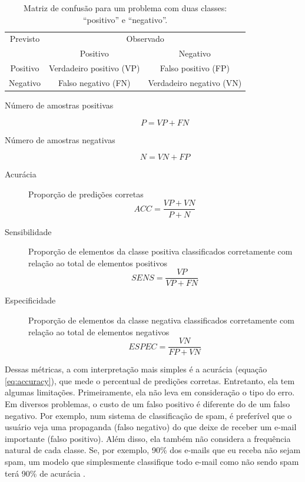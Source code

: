 \documentclass[a4paper,titlepage]{ppgi}\usepackage[]{graphicx}\usepackage[]{color}
\begin{document}
\begin{table}
\centering
\begin{tabular}{c c c}
  Previsto & \multicolumn{2}{c}{Observado} \\  \cline{2-3}
  & \multicolumn{1}{|c}{Positivo} & \multicolumn{1}{c|}{Negativo} \\
  \hline
  \multicolumn{1}{|c|}{Positivo} & Verdadeiro positivo (VP) & \multicolumn{1}{c|}{Falso positivo (FP)} \\
  \multicolumn{1}{|c|}{Negativo} & Falso negativo (FN) & \multicolumn{1}{c|}{Verdadeiro negativo (VN)} \\
  \hline
\end{tabular}
\caption{Matriz de confusão para um problema com duas classes: ``positivo'' e
``negativo''.}
\label{table:exemplo-matriz-de-confusao}
\end{table}

\begin{description}
\item[Número de amostras positivas]
\begin{equation}
\label{eq:positive-rate}
P = VP + FN
\end{equation}
\item[Número de amostras negativas]
\begin{equation}
\label{eq:negative-rate}
N = VN + FP
\end{equation}
\item[Acurácia] Proporção de predições corretas
\begin{equation}
\label{eq:accuracy}
ACC = \frac{VP + VN}{P + N}
\end{equation}
\item[Sensibilidade] Proporção de elementos da classe positiva classificados
corretamente com relação ao total de elementos positivos
\begin{equation}
\label{eq:sensitivity}
SENS = \frac{VP}{VP + FN}
\end{equation}
\item[Especificidade] Proporção de elementos da classe negativa classificados
corretamente com relação ao total de elementos negativos
\begin{equation}
\label{eq:specificity}
ESPEC = \frac{VN}{FP + VN}
\end{equation}
\end{description}

Dessas métricas, a com interpretação mais simples é a acurácia (equação
\ref{eq:accuracy}), que mede o percentual de predições corretas. Entretanto,
ela tem algumas limitações. Primeiramente, ela não leva em consideração o tipo
do erro. Em diversos problemas, o custo de um falso positivo é diferente do de
um falso negativo. Por exemplo, num sistema de classificação de spam, é
preferível que o usuário veja uma propaganda (falso negativo) do que deixe de
receber um e-mail importante (falso positivo). Além disso, ela também não
considera a frequência natural de cada classe. Se, por exemplo, 90\% dos
e-mails que eu receba não sejam spam, um modelo que simplesmente classifique
todo e-mail como não sendo spam terá 90\% de acurácia \cite{Kuhn2013}.
\end{document}
